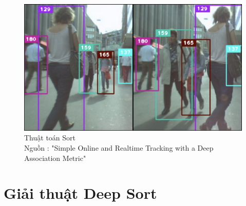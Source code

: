 \FloatBarrier
\begin{figure}[htp]
\begin{center}
\includegraphics[scale=0.3]{chap5/c5_figs/sort.png}
\end{center}
\caption{Thuật toán Sort\\Nguồn : "Simple Online and Realtime Tracking with a Deep Association Metric" \cite{wojke2017simple}}
\label{fig:sort}
\end{figure}
\FloatBarrier


\section{Giải thuật Deep Sort}

